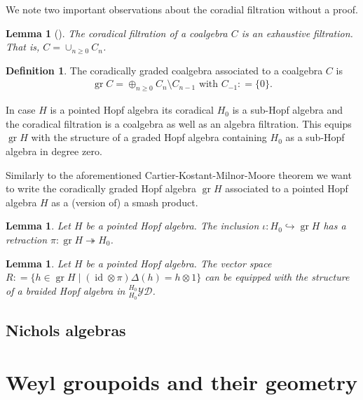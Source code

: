 \documentclass{amsart}
\newtheorem{lemma}[theorem]{Lemma}
\theoremstyle{definition}
\newtheorem{definition}[theorem]{Definition}
\newcommand{\from}{\colon}
\newcommand{\defeq}{{\colon =}}
\newcommand{\YD}[1]{\ensuremath{{}^{#1}_{#1}\mathcal{YD}}}
\DeclareMathOperator{\gr}{gr}
\DeclareMathOperator{\id}{id}
\begin{document}
	We note two important observations about the coradial filtration without a proof.
	
	\begin{lemma}[{\cite[Definition 1.13]{Andruskiewitsch2002}}] \label{lem: CoradFiltExhaustive}
		The coradical filtration of a coalgebra $C$ is an exhaustive filtration. That is, $C= \cup_{n \geq 0} C_n$.
	\end{lemma}

	\begin{definition}
	The coradically graded coalgebra associated to a coalgebra $C$ is  
		\begin{align*}
			 \gr C = \oplus_{n \geq 0} C_{n} \setminus C_{n-1} \text{ with } C_{-1} \defeq \{0\}.
		\end{align*}
	\end{definition}

	In case $H$ is a pointed Hopf algebra its coradical $H_0$ is a sub-Hopf algebra and the coradical filtration is a coalgebra as well as an algebra filtration. This equips $\gr H$ with the structure of a graded Hopf algebra containing $H_0$ as a sub-Hopf algebra in degree zero.
	
	Similarly to the aforementioned Cartier-Kostant-Milnor-Moore theorem 
	we want to write the coradically graded Hopf algebra $\gr H$ associated to a pointed Hopf algebra $H$ as a (version of) a smash product. 
	\begin{lemma}
		Let $H$ be a pointed Hopf algebra. The inclusion $\iota \from H_0 \hookrightarrow \gr H$ has a retraction $\pi \from \gr H \twoheadrightarrow H_0$.
	\end{lemma}
	
	\begin{lemma}
		Let $H$ be a pointed Hopf algebra.
		The vector space 
		$R \defeq \{ h \in \gr H \mid (\id \otimes \pi)\Delta(h) = h\otimes 1 \}$ can be equipped with the structure of a braided Hopf algebra in $\YD{H_0}$.
	\end{lemma}
	
	
	
	
	\subsection{Nichols algebras}
	

\section{Weyl groupoids and their geometry}
\end{document}
